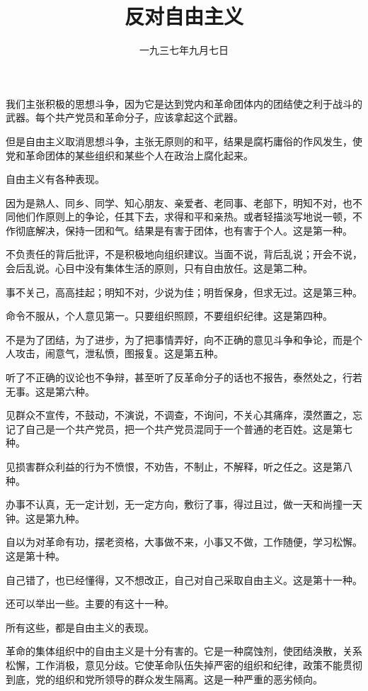 
\title{反对自由主义}
\date{一九三七年九月七日}
\maketitle


我们主张积极的思想斗争，因为它是达到党内和革命团体内的团结使之利于战斗的武器。每个共产党员和革命分子，应该拿起这个武器。

但是自由主义取消思想斗争，主张无原则的和平，结果是腐朽庸俗的作风发生，使党和革命团体的某些组织和某些个人在政治上腐化起来。

自由主义有各种表现。

因为是熟人、同乡、同学、知心朋友、亲爱者、老同事、老部下，明知不对，也不同他们作原则上的争论，任其下去，求得和平和亲热。或者轻描淡写地说一顿，不作彻底解决，保持一团和气。结果是有害于团体，也有害于个人。这是第一种。

不负责任的背后批评，不是积极地向组织建议。当面不说，背后乱说；开会不说，会后乱说。心目中没有集体生活的原则，只有自由放任。这是第二种。

事不关己，高高挂起；明知不对，少说为佳；明哲保身，但求无过。这是第三种。

命令不服从，个人意见第一。只要组织照顾，不要组织纪律。这是第四种。

不是为了团结，为了进步，为了把事情弄好，向不正确的意见斗争和争论，而是个人攻击，闹意气，泄私愤，图报复。这是第五种。

听了不正确的议论也不争辩，甚至听了反革命分子的话也不报告，泰然处之，行若无事。这是第六种。

见群众不宣传，不鼓动，不演说，不调查，不询问，不关心其痛痒，漠然置之，忘记了自己是一个共产党员，把一个共产党员混同于一个普通的老百姓。这是第七种。

见损害群众利益的行为不愤恨，不劝告，不制止，不解释，听之任之。这是第八种。

办事不认真，无一定计划，无一定方向，敷衍了事，得过且过，做一天和尚撞一天钟。这是第九种。

自以为对革命有功，摆老资格，大事做不来，小事又不做，工作随便，学习松懈。这是第十种。

自己错了，也已经懂得，又不想改正，自己对自己采取自由主义。这是第十一种。

还可以举出一些。主要的有这十一种。

所有这些，都是自由主义的表现。

革命的集体组织中的自由主义是十分有害的。它是一种腐蚀剂，使团结涣散，关系松懈，工作消极，意见分歧。它使革命队伍失掉严密的组织和纪律，政策不能贯彻到底，党的组织和党所领导的群众发生隔离。这是一种严重的恶劣倾向。

